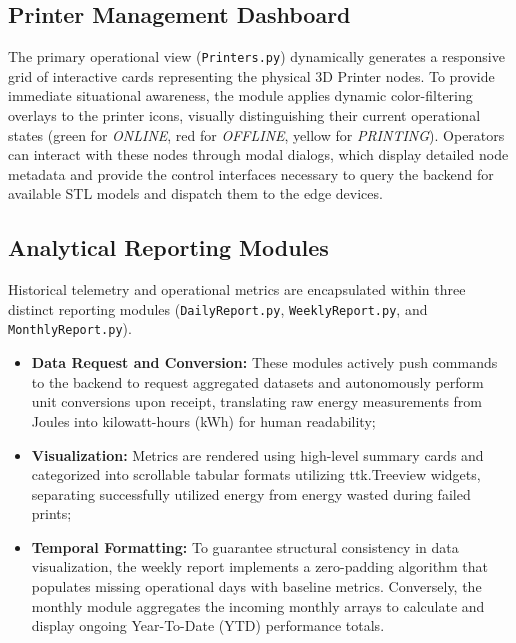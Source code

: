 \subsection{Printer Management Dashboard}
The primary operational view (\texttt{Printers.py}) dynamically generates a responsive grid of interactive cards representing the physical 3D Printer nodes. To provide immediate situational awareness, the module applies dynamic color-filtering overlays to the printer icons, visually distinguishing their current operational states (green for \textit{ONLINE}, red for \textit{OFFLINE}, yellow for \textit{PRINTING}). Operators can interact with these nodes through modal dialogs, which display detailed node metadata and provide the control interfaces necessary to query the backend for available STL models and dispatch them to the edge devices. 

\subsection{Analytical Reporting Modules}
Historical telemetry and operational metrics are encapsulated within three distinct reporting modules (\texttt{DailyReport.py}, \texttt{WeeklyReport.py}, and \texttt{MonthlyReport.py}).
\begin{itemize}
	\item \textbf{Data Request and Conversion:} These modules actively push commands to the backend to request aggregated datasets and autonomously perform unit conversions upon receipt, translating raw energy measurements from Joules into kilowatt-hours (kWh) for human readability;
	\item \textbf{Visualization:} Metrics are rendered using high-level summary cards and categorized into scrollable tabular formats utilizing ttk.Treeview widgets, separating successfully utilized energy from energy wasted during failed prints;
	\item \textbf{Temporal Formatting:} To guarantee structural consistency in data visualization, the weekly report implements a zero-padding algorithm that populates missing operational days with baseline metrics. Conversely, the monthly module aggregates the incoming monthly arrays to calculate and display ongoing Year-To-Date (YTD) performance totals. 
\end{itemize}
